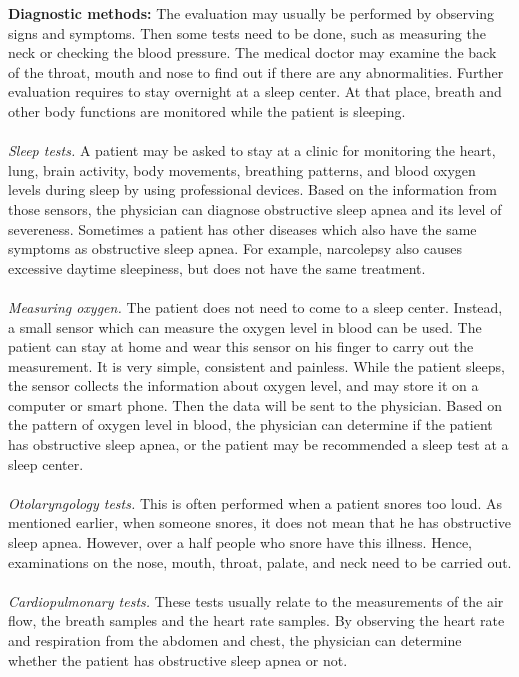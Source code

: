     \textbf{Diagnostic methods:}
    The evaluation may usually be performed by observing signs and symptoms. Then some tests need to be done, such as measuring the neck or checking the blood pressure. The medical doctor may examine the back of the throat, mouth and nose to find out if there are any abnormalities. Further evaluation requires to stay overnight at a sleep center. At that place, breath and other body functions are monitored while the patient is sleeping.\\\\
    \textit{Sleep tests.} 
    A patient may be asked to stay at a clinic for monitoring the heart, lung, brain activity, body movements, breathing patterns, and blood oxygen levels during sleep by using professional devices. Based on the information from those sensors, the physician can diagnose obstructive sleep apnea and its level of severeness. Sometimes a patient has other diseases which also have the same symptoms as obstructive sleep apnea. For example, narcolepsy also causes excessive daytime sleepiness, but does not have the same treatment.\\\\
    \textit{Measuring oxygen.} 
    The patient does not need to come to a sleep center. Instead, a small sensor which can measure the oxygen level in blood can be used. The patient can stay at home and wear this sensor on his finger to carry out the measurement. It is very simple, consistent and painless. While the patient sleeps, the sensor collects the information about oxygen level, and may store it on a computer or smart phone. Then the data will be sent to the physician. Based on the pattern of oxygen level in blood, the physician can determine if the patient has obstructive sleep apnea, or the patient may be recommended a sleep test at a sleep center.\\\\
    \textit{Otolaryngology tests.}
    This is often performed when a patient snores too loud. As mentioned earlier, when someone snores, it does not mean that he has obstructive sleep apnea. However, over a half people who snore have this illness. Hence, examinations on the nose, mouth, throat, palate, and neck need to be carried out.\\\\ 
    \textit{Cardiopulmonary tests.} 
    These tests usually relate to the measurements of the air flow, the breath samples and the heart rate samples. By observing the heart rate and respiration from the abdomen and chest, the physician can determine whether the patient has obstructive sleep apnea or not. 

